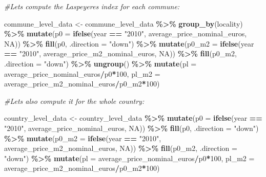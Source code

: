 \documentclass[
]{article}
\newenvironment{Shaded}{\begin{snugshade}}{\end{snugshade}}
\newcommand{\AttributeTok}[1]{\textcolor[rgb]{0.13,0.29,0.53}{#1}}
\newcommand{\CommentTok}[1]{\textcolor[rgb]{0.56,0.35,0.01}{\textit{#1}}}
\newcommand{\ConstantTok}[1]{\textcolor[rgb]{0.56,0.35,0.01}{#1}}
\newcommand{\DecValTok}[1]{\textcolor[rgb]{0.00,0.00,0.81}{#1}}
\newcommand{\FunctionTok}[1]{\textcolor[rgb]{0.13,0.29,0.53}{\textbf{#1}}}
\newcommand{\NormalTok}[1]{#1}
\newcommand{\OtherTok}[1]{\textcolor[rgb]{0.56,0.35,0.01}{#1}}
\newcommand{\SpecialCharTok}[1]{\textcolor[rgb]{0.81,0.36,0.00}{\textbf{#1}}}
\newcommand{\StringTok}[1]{\textcolor[rgb]{0.31,0.60,0.02}{#1}}
\begin{document}
\begin{Shaded}
\begin{Highlighting}[]
\CommentTok{\#Let\textquotesingle{}s compute the Laspeyeres index for each commune:}

\NormalTok{commune\_level\_data }\OtherTok{\textless{}{-}}\NormalTok{ commune\_level\_data }\SpecialCharTok{\%\textgreater{}\%}
  \FunctionTok{group\_by}\NormalTok{(locality) }\SpecialCharTok{\%\textgreater{}\%}
  \FunctionTok{mutate}\NormalTok{(}\AttributeTok{p0 =} \FunctionTok{ifelse}\NormalTok{(year }\SpecialCharTok{==} \StringTok{"2010"}\NormalTok{, average\_price\_nominal\_euros, }\ConstantTok{NA}\NormalTok{)) }\SpecialCharTok{\%\textgreater{}\%}
  \FunctionTok{fill}\NormalTok{(p0, }\AttributeTok{.direction =} \StringTok{"down"}\NormalTok{) }\SpecialCharTok{\%\textgreater{}\%}
  \FunctionTok{mutate}\NormalTok{(}\AttributeTok{p0\_m2 =} \FunctionTok{ifelse}\NormalTok{(year }\SpecialCharTok{==} \StringTok{"2010"}\NormalTok{, average\_price\_m2\_nominal\_euros, }\ConstantTok{NA}\NormalTok{)) }\SpecialCharTok{\%\textgreater{}\%}
  \FunctionTok{fill}\NormalTok{(p0\_m2, }\AttributeTok{.direction =} \StringTok{"down"}\NormalTok{) }\SpecialCharTok{\%\textgreater{}\%}
  \FunctionTok{ungroup}\NormalTok{() }\SpecialCharTok{\%\textgreater{}\%}
  \FunctionTok{mutate}\NormalTok{(}\AttributeTok{pl =}\NormalTok{ average\_price\_nominal\_euros}\SpecialCharTok{/}\NormalTok{p0}\SpecialCharTok{*}\DecValTok{100}\NormalTok{,}
         \AttributeTok{pl\_m2 =}\NormalTok{ average\_price\_m2\_nominal\_euros}\SpecialCharTok{/}\NormalTok{p0\_m2}\SpecialCharTok{*}\DecValTok{100}\NormalTok{)}


\CommentTok{\#Let\textquotesingle{}s also compute it for the whole country:}

\NormalTok{country\_level\_data }\OtherTok{\textless{}{-}}\NormalTok{ country\_level\_data }\SpecialCharTok{\%\textgreater{}\%}
  \FunctionTok{mutate}\NormalTok{(}\AttributeTok{p0 =} \FunctionTok{ifelse}\NormalTok{(year }\SpecialCharTok{==} \StringTok{"2010"}\NormalTok{, average\_price\_nominal\_euros, }\ConstantTok{NA}\NormalTok{)) }\SpecialCharTok{\%\textgreater{}\%}
  \FunctionTok{fill}\NormalTok{(p0, }\AttributeTok{.direction =} \StringTok{"down"}\NormalTok{) }\SpecialCharTok{\%\textgreater{}\%}
  \FunctionTok{mutate}\NormalTok{(}\AttributeTok{p0\_m2 =} \FunctionTok{ifelse}\NormalTok{(year }\SpecialCharTok{==} \StringTok{"2010"}\NormalTok{, average\_price\_m2\_nominal\_euros, }\ConstantTok{NA}\NormalTok{)) }\SpecialCharTok{\%\textgreater{}\%}
  \FunctionTok{fill}\NormalTok{(p0\_m2, }\AttributeTok{.direction =} \StringTok{"down"}\NormalTok{) }\SpecialCharTok{\%\textgreater{}\%}
  \FunctionTok{mutate}\NormalTok{(}\AttributeTok{pl =}\NormalTok{ average\_price\_nominal\_euros}\SpecialCharTok{/}\NormalTok{p0}\SpecialCharTok{*}\DecValTok{100}\NormalTok{,}
         \AttributeTok{pl\_m2 =}\NormalTok{ average\_price\_m2\_nominal\_euros}\SpecialCharTok{/}\NormalTok{p0\_m2}\SpecialCharTok{*}\DecValTok{100}\NormalTok{)}



\end{Highlighting}
\end{Shaded}
\end{document}
